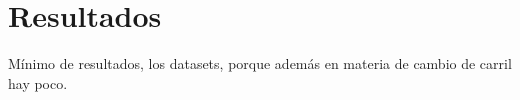 \chapter{Resultados}
\label{ch:results}

Mínimo de resultados, los datasets, porque además en materia de cambio de carril hay poco.